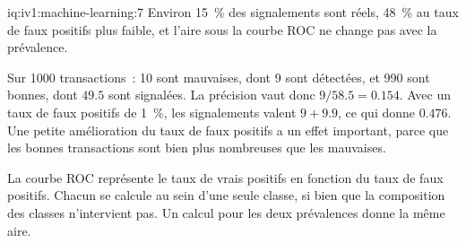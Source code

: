 \begin{solution}{iq:iv1:machine-learning:7}
Environ 15~\% des signalements sont réels, 48~\% au taux de faux positifs plus faible, et l'aire sous la courbe ROC ne change pas avec la prévalence.

Sur 1000 transactions~: 10 sont mauvaises, dont 9 sont détectées, et 990 sont bonnes, dont $49.5$ sont signalées. La précision vaut donc $9/58.5 = 0.154$. Avec un taux de faux positifs de 1~\%, les signalements valent $9 + 9.9$, ce qui donne $0.476$. Une petite amélioration du taux de faux positifs a un effet important, parce que les bonnes transactions sont bien plus nombreuses que les mauvaises.

La courbe ROC représente le taux de vrais positifs en fonction du taux de faux positifs. Chacun se calcule au sein d'une seule classe, si bien que la composition des classes n'intervient pas. Un calcul pour les deux prévalences donne la même aire.



\end{solution}

